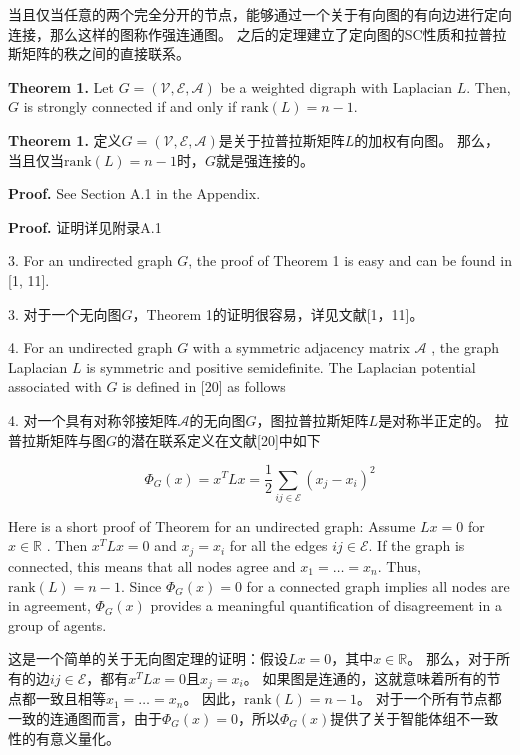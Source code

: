 \documentclass{article}
\begin{document}
当且仅当任意的两个完全分开的节点，能够通过一个关于有向图的有向边进行定向连接，那么这样的图称作强连通图。
之后的定理建立了定向图的SC性质和拉普拉斯矩阵的秩之间的直接联系。

{\color[gray]{0.5}
\noindent \textbf{Theorem 1.} Let $G=(\mathcal{V},\mathcal{E},\mathcal{A})$ be a weighted digraph with Laplacian $L$. 
Then, $G$ is strongly connected if and only if $\text{rank}(L)=n-1$.
}

\noindent \textbf{Theorem 1.} 定义$G=(\mathcal{V},\mathcal{E},\mathcal{A})$是关于拉普拉斯矩阵$L$的加权有向图。
那么，当且仅当$\text{rank}(L)=n-1$时，$G$就是强连接的。

{\color[gray]{0.5}
\noindent \textbf{Proof.} See Section A.1 in the Appendix.
}

\noindent \textbf{Proof.} 证明详见附录A.1

{\color[gray]{0.5}
 3. For an undirected graph $G$, the proof of Theorem 1 is easy and can be found in [1, 11].
}

 3. 对于一个无向图$G$，Theorem 1的证明很容易，详见文献[1，11]。

{\color[gray]{0.5}
 4. For an undirected graph $G$ with a symmetric adjacency matrix $\mathcal{A}$ , the graph Laplacian $L$ is symmetric and positive semideﬁnite. 
The Laplacian potential associated with $G$ is deﬁned in [20] as follows
}

 4. 对一个具有对称邻接矩阵$\mathcal{A}$的无向图$G$，图拉普拉斯矩阵$L$是对称半正定的。
拉普拉斯矩阵与图$G$的潜在联系定义在文献[20]中如下

\begin{equation}
    \Phi_G(x) = x^T Lx = \frac{1}{2} \sum_{ij\in \mathcal{E}}(x_j - x_i)^2
    \tag{13}
    \label{13}
\end{equation}

{\color[gray]{0.5}
\noindent Here is a short proof of Theorem for an undirected graph: Assume $Lx=0$ for $x\in \mathbb{R}$ . 
Then $x^TLx=0$ and $x_j=x_i$ for all the edges $ij\in \mathcal{E}$. 
If the graph is connected, this means that all nodes agree and $x_1=\dots=x_n$. 
Thus, $\text{rank}(L)=n-1$. 
Since $\Phi_G(x)=0$ for a connected graph implies all nodes are in agreement, $\Phi_G(x)$ provides a meaningful quantiﬁcation of disagreement in a group of agents.
}

\noindent 这是一个简单的关于无向图定理的证明：假设$Lx=0$，其中$x\in \mathbb{R}$。
那么，对于所有的边$ij\in \mathcal{E}$，都有$x^TLx=0$且$x_j=x_i$。
如果图是连通的，这就意味着所有的节点都一致且相等$x_1=\dots=x_n$。
因此，$\text{rank}(L)=n-1$。
对于一个所有节点都一致的连通图而言，由于$\Phi_G(x)=0$，所以$\Phi_G(x)$提供了关于智能体组不一致性的有意义量化。
\end{document}

